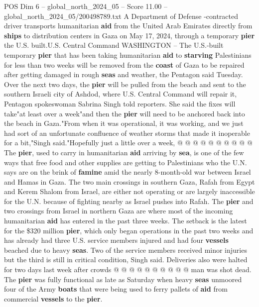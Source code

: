 \begin{textsample}{POS Dim 6 – global\_north\_2024\_05 – Score 11.00 – global\_north\_2024\_05/200498789.txt}  \label{ex:f6_pos_142}
A Department of Defense -contracted driver transports humanitarian \textbf{aid} from the United Arab Emirates directly from \textbf{ships} to distribution centers in Gaza on May 17, 2024, through a temporary \textbf{pier} the U.S. built.U.S.
Central Command WASHINGTON -- The U.S.-built temporary \textbf{pier} that has been taking humanitarian \textbf{aid} to \textbf{starving} Palestinians for less than two weeks will be removed from the \textbf{coast} of Gaza to be repaired after getting damaged in rough \textbf{seas} and weather, the Pentagon said Tuesday.
Over the next two days, the \textbf{pier} will be pulled from the beach and sent to the southern Israeli city of Ashdod, where U.S.
Central Command will repair it, Pentagon spokeswoman Sabrina Singh told reporters.
She said the fixes will take"at least over a week"and then the \textbf{pier} will need to be anchored back into the beach in Gaza."From when it was operational, it was working, and we just had sort of an unfortunate confluence of weather storms that made it inoperable for a bit,"Singh said."Hopefully just a little over a week, @ @ @ @ @ @ @ @ @ @ The \textbf{pier}, used to carry in humanitarian \textbf{aid} arriving by \textbf{sea}, is one of the few ways that free food and other supplies are getting to Palestinians who the U.N. says are on the brink of \textbf{famine} amid the nearly 8-month-old war between Israel and Hamas in Gaza.
The two main crossings in southern Gaza, Rafah from Egypt and Kerem Shalom from Israel, are either not operating or are largely inaccessible for the U.N. because of fighting nearby as Israel pushes into Rafah.
The \textbf{pier} and two crossings from Israel in northern Gaza are where most of the incoming humanitarian \textbf{aid} has entered in the past three weeks.
The setback is the latest for the \$320 million \textbf{pier}, which only began operations in the past two weeks and has already had three U.S. service members injured and had four \textbf{vessels} beached due to heavy \textbf{seas}.
Two of the service members received minor injuries but the third is still in critical condition, Singh said.
Deliveries also were halted for two days last week after crowds @ @ @ @ @ @ @ @ @ @ man was shot dead.
The \textbf{pier} was fully functional as late as Saturday when heavy \textbf{seas} unmoored four of the Army \textbf{boats} that were being used to ferry pallets of \textbf{aid} from commercial \textbf{vessels} to the \textbf{pier}.

\end{textsample}
